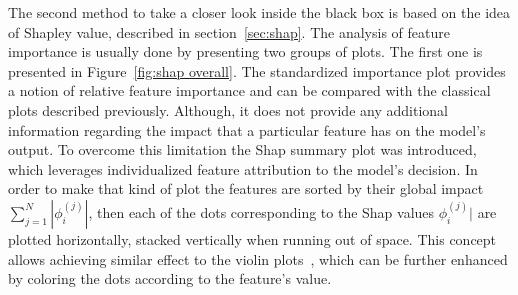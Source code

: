 The second method to take a closer look inside the black box is based on the idea of Shapley value, described in section~\ref{sec:shap}. The analysis of  feature importance is usually done by presenting two groups of plots. The first one is presented in Figure~\ref{fig:shap overall}. The standardized importance plot provides a notion of relative feature importance and can be compared with the classical plots described previously. Although, it does not provide any additional information regarding the impact that a particular feature has on the model's output. To overcome this limitation the Shap summary plot was introduced, which leverages individualized feature attribution to the model's decision. In order to make that kind of plot the features are sorted by their global impact $\sum_{j=1}^{N}|\phi_i^{(j)}|$, then each of the dots corresponding to the Shap values $\phi_i^{(j)}|$ are plotted horizontally, stacked vertically when running out of space. This concept allows achieving similar effect to the violin plots~\cite{ViolinPlot}, which can be further enhanced by coloring the dots according to the feature's value. 

